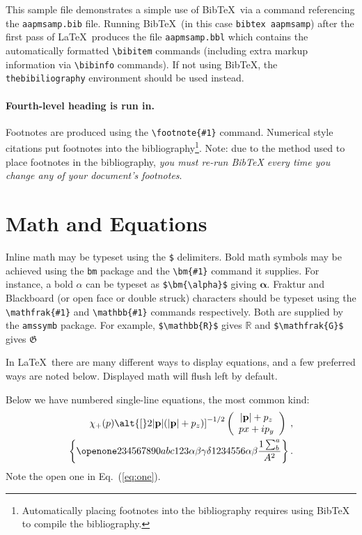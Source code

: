 \documentclass[%
 aapm,
 mph,%
 amsmath,amssymb,
 reprint,%
]{revtex4-2}
\begin{document}
This sample file demonstrates a simple use of Bib\TeX\ 
via a \verb++ command referencing the \verb+aapmsamp.bib+ file.
Running Bib\TeX\ (in this case \texttt{bibtex
aapmsamp}) after the first pass of \LaTeX\ produces the file
\verb+aapmsamp.bbl+ which contains the automatically formatted
\verb+\bibitem+ commands (including extra markup information via
\verb+\bibinfo+ commands). If not using Bib\TeX, the
\verb+thebibiliography+ environment should be used instead.

\paragraph{Fourth-level heading is run in.}%
Footnotes are produced using the \verb+\footnote{#1}+ command. 
Numerical style citations put footnotes into the 
bibliography\footnote{Automatically placing footnotes into the bibliography requires using BibTeX to compile the bibliography.}.
Note: due to the method used to place footnotes in the bibliography, \emph{you
must re-run BibTeX every time you change any of your document's
footnotes}. 

\section{Math and Equations}
Inline math may be typeset using the \verb+$+ delimiters. Bold math
symbols may be achieved using the \verb+bm+ package and the
\verb+\bm{#1}+ command it supplies. For instance, a bold $\alpha$ can
be typeset as \verb+$\bm{\alpha}$+ giving $\bm{\alpha}$. Fraktur and
Blackboard (or open face or double struck) characters should be
typeset using the \verb+\mathfrak{#1}+ and \verb+\mathbb{#1}+ commands
respectively. Both are supplied by the \texttt{amssymb} package. For
example, \verb+$\mathbb{R}$+ gives $\mathbb{R}$ and
\verb+$\mathfrak{G}$+ gives $\mathfrak{G}$

In \LaTeX\ there are many different ways to display equations, and a
few preferred ways are noted below. Displayed math will flush left by
default.

Below we have numbered single-line equations, the most common kind: 
\begin{eqnarray}
\chi_+(p)\alt{\bf [}2|{\bf p}|(|{\bf p}|+p_z){\bf ]}^{-1/2}
\left(
\begin{array}{c}
|{\bf p}|+p_z\\
px+ip_y
\end{array}\right)\;,
\\
\left\{%
 \openone234567890abc123\alpha\beta\gamma\delta1234556\alpha\beta
 \frac{1\sum^{a}_{b}}{A^2}%
\right\}%
\label{eq:one}.
\end{eqnarray}
Note the open one in Eq.~(\ref{eq:one}).
\end{document}
